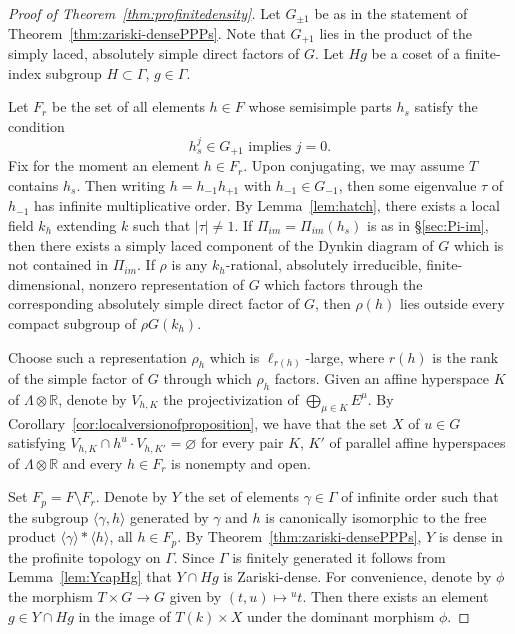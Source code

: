 \documentclass{amsart}
\theoremstyle{plain}
\theoremstyle{definition}
\theoremstyle{remark}
\providecommand{\abs}[1]{\lvert#1\rvert}
\begin{document}
\begin{proof}[Proof of Theorem~\ref{thm:profinitedensity}]
Let $G_{\pm 1}$ be as in the statement of Theorem~\ref{thm:zariski-densePPPs}. Note that
$G_{+1}$ lies in the product of the simply laced, absolutely simple direct factors of
$G$. Let $Hg$ be a coset of a finite-index subgroup $H \subset \Gamma$, $g\in \Gamma$.

Let $F_{r}$ be the set of all elements $h \in F$ whose semisimple parts $h_{s}$
satisfy the condition
$$h_{s}^{j} \in G_{+1} \text{ implies } j = 0.$$
Fix for the moment an element $h \in F_{r}$. Upon conjugating, we may assume $T$
contains $h_{s}$. Then writing $h = h_{-1}h_{+1}$ with $h_{-1} \in G_{-1}$, then some
eigenvalue $\tau$ of $h_{-1}$ has infinite multiplicative order. By Lemma~\ref{lem:hatch},
there exists a local field $k_{h}$
extending $k$ such that $\abs{\tau} \neq 1$. If $\Pi_{im} =
\Pi_{im}(h_{s})$ is as in \S\ref{sec:Pi-im}, then there exists a simply laced
component of the Dynkin diagram of $G$ which is not contained in $\Pi_{im}$. If $\rho$
is any $k_{h}$-rational, absolutely irreducible, finite-dimensional, nonzero representation of
$G$ which factors through the
corresponding absolutely simple
direct factor of $G$, then $\rho(h)$ lies outside every compact subgroup of $\rho G(k_{h})$.

Choose such a representation $\rho_{h}$ which is $\ell_{r(h)}$-large, where $r(h)$ is the rank of the simple factor of $G$ through which $\rho_{h}$ factors. 
Given an affine hyperspace $K$ of $\Lambda \otimes \mathbb{R}$, denote by $V_{h, K}$ the
projectivization of $\bigoplus_{\mu \in K} E^{\mu}$. By
Corollary~\ref{cor:localversionofproposition}, we have that the set $X$ of $u \in G$
satisfying $V_{h, K} \cap h^{u} \cdot V_{h, K'} = \varnothing$ for every pair $K$, $K'$ of
parallel affine hyperspaces of $\Lambda \otimes \mathbb{R}$ and every $h \in F_{r}$ is
nonempty and open.

Set $F_{p} = F \setminus F_{r}$. Denote by $Y$ the set of elements $\gamma \in \Gamma$
of infinite order such that the subgroup
$\langle \gamma, h\rangle$ generated by $\gamma$ and $h$ is canonically isomorphic to the
free product
$\langle \gamma \rangle * \langle h\rangle$, all $h \in F_{p}$. By Theorem~\ref{thm:zariski-densePPPs}, $Y$ is dense in the profinite topology on $\Gamma$. Since $\Gamma$ is finitely generated it follows from
Lemma~\ref{lem:YcapHg} that $Y \cap Hg$ is Zariski-dense. For convenience, denote by
$\phi$ the morphism $T \times G \to G$ given by $(t, u) \mapsto \mbox{}^{u}t$. Then
there exists an element $g \in Y \cap Hg$ in the image of $T(k) \times X$ under the
dominant morphism $\phi$.


\end{proof}
\end{document}
